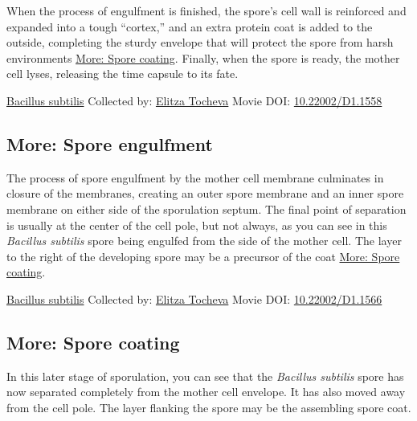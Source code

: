\documentclass[]{tufte-book}
\begin{document}
When the process of engulfment is finished, the spore's cell wall is reinforced and expanded into a tough ``cortex,'' and an extra protein coat is added to the outside, completing the sturdy envelope that will protect the spore from harsh environments \protect\hyperlink{Spore_coating}{More: Spore coating}. Finally, when the spore is ready, the mother cell lyses, releasing the time capsule to its fate.



\hypertarget{htmlwidget-65854e78e119d0a5db6c}{}

\label{fig:8-6}\protect\hyperlink{tree}{Bacillus subtilis} Collected by: \protect\hyperlink{elitza_tocheva}{Elitza Tocheva} Movie DOI: \href{https://doi.org/10.22002/D1.1558}{10.22002/D1.1558}

\hypertarget{Spore_engulfment}{%
\subsection*{More: Spore engulfment}\label{Spore_engulfment}}

The process of spore engulfment by the mother cell membrane culminates in closure of the membranes, creating an outer spore membrane and an inner spore membrane on either side of the sporulation septum. The final point of separation is usually at the center of the cell pole, but not always, as you can see in this \emph{Bacillus subtilis} spore being engulfed from the side of the mother cell. The layer to the right of the developing spore may be a precursor of the coat \protect\hyperlink{Spore_coating}{More: Spore coating}.



\hypertarget{htmlwidget-a1e93f7369e110778f01}{}

\label{fig:8-6a}\protect\hyperlink{tree}{Bacillus subtilis} Collected by: \protect\hyperlink{elitza_tocheva}{Elitza Tocheva} Movie DOI: \href{https://doi.org/10.22002/D1.1566}{10.22002/D1.1566}

\hypertarget{Spore_coating}{%
\subsection*{More: Spore coating}\label{Spore_coating}}

In this later stage of sporulation, you can see that the \emph{Bacillus subtilis} spore has now separated completely from the mother cell envelope. It has also moved away from the cell pole. The layer flanking the spore may be the assembling spore coat.
\end{document}
